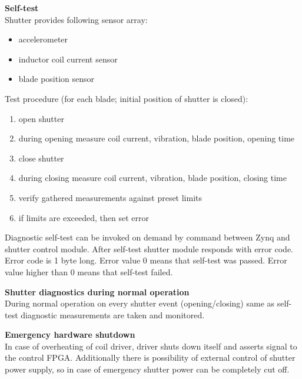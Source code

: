 \begin{description}

\item \textbf{Self-test} \hfill \\
Shutter provides following sensor array:
\begin{itemize}
\item accelerometer
\item inductor coil current sensor
\item blade position sensor
\end{itemize}

Test procedure (for each blade; initial position of shutter is closed):

\begin{enumerate}
\item open shutter
\item during opening measure coil current, vibration, blade position, opening time
\item close shutter
\item during closing measure coil current, vibration, blade position, closing time
\item verify gathered measurements against preset limits
\item if limits are exceeded, then set error
\end{enumerate}

Diagnostic self-test can be invoked on demand by command between Zynq and shutter control module. After self-test shutter module responds with error code. Error code is 1 byte long. Error value 0 means that self-test was passed. Error value higher than 0 means that self-test failed.

\item \textbf{Shutter diagnostics during normal operation} \hfill \\
During normal operation on every shutter event (opening/closing) same as self-test diagnostic measurements are taken and monitored.

\item \textbf{Emergency hardware shutdown} \hfill \\
In case of overheating of coil driver, driver shuts down itself and asserts signal to the control FPGA. Additionally there is possibility of external control of shutter power supply, so in case of emergency shutter power can be completely cut off.

\end{description}

